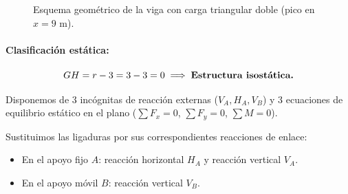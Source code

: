 \begin{figure}[H]
{%

    }

    \caption{Esquema geométrico de la viga con carga triangular doble (pico en $x = 9\text{ m}$).}

    \label{fig:ejemplo5_esquema}

\end{figure}



\paragraph{Clasificación estática:}

\begin{equation}

    GH = r - 3 = 3 - 3 = 0 \implies \text{\textbf{Estructura isostática.}}

\end{equation}

Disponemos de 3 incógnitas de reacción externas ($V_A, H_A, V_B$) y 3 ecuaciones de equilibrio estático en el plano ($\sum F_x = 0$, $\sum F_y = 0$, $\sum M = 0$).






Sustituimos las ligaduras por sus correspondientes reacciones de enlace:

\begin{itemize}

    \item En el apoyo fijo $A$: reacción horizontal $H_A$ y reacción vertical $V_A$.

    \item En el apoyo móvil $B$: reacción vertical $V_B$.

\end{itemize}



